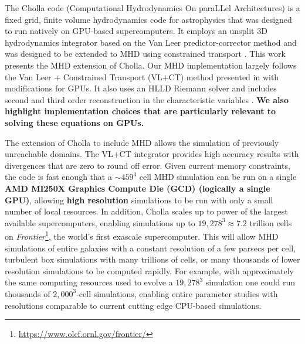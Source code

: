 \documentclass[modern, linenumbers]{aastex631}
\begin{document}
The Cholla code (Computational Hydrodynamics On paraLLel Architectures) \citep{schneider_2015} is a fixed grid, finite volume hydrodynamics code for astrophysics that was designed to run natively on GPU-based supercomputers. It employs an unsplit 3D hydrodynamics integrator based on the Van Leer predictor-corrector method \citep{falle_1991, van_leer_2006} and was designed to be extended to MHD using constrained transport \citep{evans_1988}. This work presents the MHD extension of Cholla. Our MHD implementation largely follows the Van Leer + Constrained Transport (VL+CT) method presented in \cite{stone_2009} with modifications for GPUs. It also uses an HLLD Riemann solver \citep{hlld_2005} and includes second \citep{stone_2009} and third \citep{felker_2018} order reconstruction in the characteristic variables \citep{stone_athena_2008}. \textbf{We also highlight implementation choices that are particularly relevant to solving these equations on GPUs.}

The extension of Cholla to include MHD allows the simulation of previously unreachable domains. The VL+CT integrator provides high accuracy results with divergences that are zero to round off error. Given current memory constraints, the code is fast enough that a $\sim459^3$ cell MHD simulation can be run on a single \textbf{AMD MI250X Graphics Compute Die (GCD) (logically a single GPU)}, allowing \textbf{high resolution} simulations to be run with only a small number of local resources. In addition, Cholla scales up to power of the largest available supercomputers, enabling simulations up to $19,278^3 \approx 7.2$ trillion cells on \textit{Frontier}\footnote{\url{https://www.olcf.ornl.gov/frontier/}}, the world's first exascale supercomputer. This will allow MHD simulations of entire galaxies with a constant resolution of a few parsecs per cell, turbulent box simulations with many trillions of cells, or many thousands of lower resolution simulations to be computed rapidly. For example, with approximately the same computing resources used to evolve a $19,278^3$ simulation one could run thousands of $2,000^3$-cell simulations, enabling entire parameter studies with resolutions comparable to current cutting edge CPU-based simulations.
\end{document}
